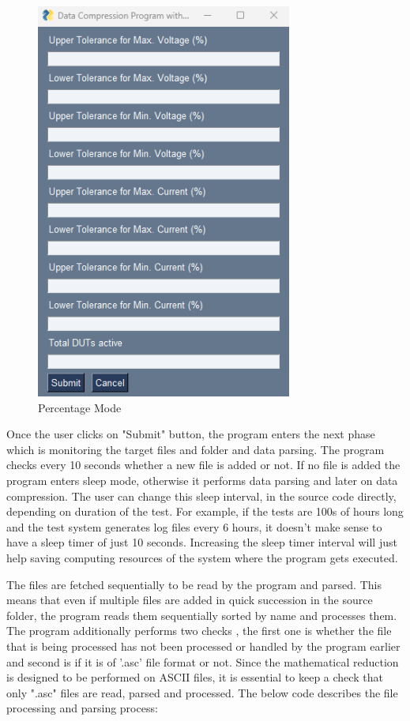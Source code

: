 \begin{figure}[!h]
    	\centering
    	\includegraphics[width= 0.75\textwidth]{images/GUI-perc.png}
    	\caption [Percentage Values]{Percentage Mode}  
    	\label{fig:Percentage Mode}
\end{figure}

\clearpage

Once the user clicks on "Submit" button, the program enters the next phase which is monitoring the target files and folder and data parsing. The program checks every 10 seconds whether a new file is added or not. If no file is added the program enters sleep mode, otherwise it performs data parsing and later on data compression. The user can change this sleep interval, in the source code directly, depending on duration of the test. For example, if the tests are 100s of hours long and the test system generates log files every 6 hours, it doesn't make sense to have a sleep timer of just 10 seconds. Increasing the sleep timer interval will just help saving computing resources of the system where the program gets executed. 

The files are fetched sequentially to be read by the program and parsed. This means that even if multiple files are added in quick succession in the source folder, the program reads them sequentially sorted by name and processes them. The program additionally performs two checks , the first one is whether the file that is being processed has not been processed or handled by the program earlier and second is if it is of '.asc' file format or not. Since the mathematical reduction is designed to be performed on ASCII files, it is essential to keep a check that only ".asc" files are read, parsed and processed. The below code describes the file processing and parsing process:


